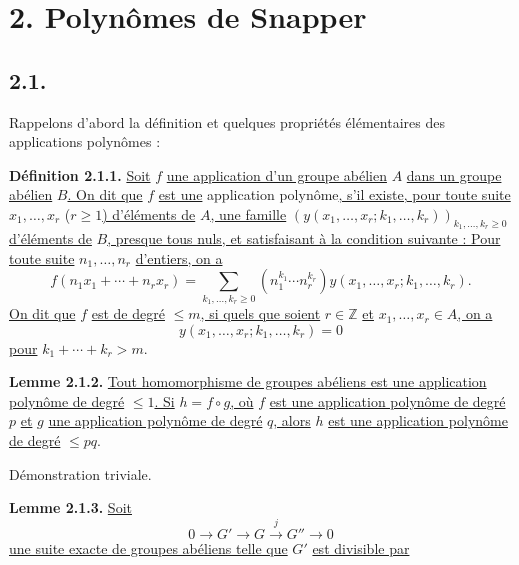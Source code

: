 
\section*{2. Polynômes de Snapper}

\subsection*{2.1.}
Rappelons d'abord la définition et quelques propriétés élémentaires des applications polynômes :

\textbf{Définition 2.1.1.} \uline{Soit} $f$ \uline{une application d'un groupe abélien} $A$ \uline{dans un groupe abélien} $B$\uline{. On dit que} $f$ \uline{est une} application polynôme\uline{, s'il existe, pour toute suite} $x_1,\ldots,x_r$ ($r\geq1$\uline{) d'éléments de} $A$\uline{, une famille} $(y(x_1,\ldots,x_r;k_1,\ldots,k_r))_{k_1,\ldots,k_r\geq0}$ \uline{d'éléments de} $B$\uline{, presque tous nuls, et satisfaisant à la condition suivante : Pour toute suite} $n_1,\ldots,n_r$ \uline{d'entiers, on a}
\[
f(n_1x_1+\cdots+n_rx_r)=
\sum_{k_1,\ldots,k_r\geq0}(n_1^{k_1}\cdots n_r^{k_r})
y(x_1,\ldots,x_r;k_1,\ldots,k_r).
\]
\uline{On dit que} $f$ \uline{est de degré} $\leq m$\uline{, si quels que soient} $r\in\mathbb Z$ \uline{et} $x_1,\ldots,x_r\in A$\uline{, on a}
\[
y(x_1,\ldots,x_r;k_1,\ldots,k_r)=0
\]
\uline{pour} $k_1+\cdots+k_r>m$.

\textbf{Lemme 2.1.2.} \uline{Tout homomorphisme de groupes abéliens est une application polynôme de degré} $\leq1$\uline{. Si} $h=f\circ g$\uline{, où} $f$ \uline{est une application polynôme de degré} $p$ \uline{et} $g$ \uline{une application polynôme de degré} $q$\uline{, alors} $h$ \uline{est une application polynôme de degré} $\leq pq$.

Démonstration triviale.

\textbf{Lemme 2.1.3.} \uline{Soit}
\[
0\longrightarrow G'\longrightarrow G\xrightarrow{j}G''\longrightarrow0
\]
\uline{une suite exacte de groupes abéliens telle que} $G'$ \uline{est divisible par}
